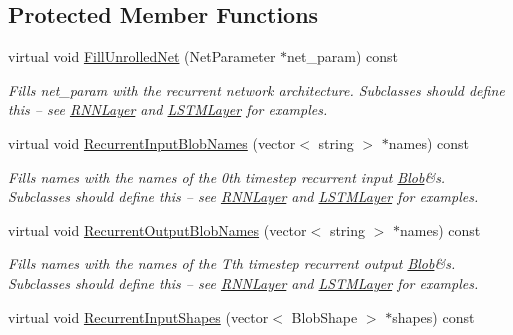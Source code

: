 \subsection*{Protected Member Functions}
\begin{DoxyCompactItemize}
\item 
virtual void \hyperlink{classcaffe_1_1LSTMLayer_aee83b6364883ffcb8f2c15a18a3031ac}{Fill\+Unrolled\+Net} (Net\+Parameter $\ast$net\+\_\+param) const \hypertarget{classcaffe_1_1LSTMLayer_aee83b6364883ffcb8f2c15a18a3031ac}{}\label{classcaffe_1_1LSTMLayer_aee83b6364883ffcb8f2c15a18a3031ac}

\begin{DoxyCompactList}\small\item\em Fills net\+\_\+param with the recurrent network architecture. Subclasses should define this -- see \hyperlink{classcaffe_1_1RNNLayer}{R\+N\+N\+Layer} and \hyperlink{classcaffe_1_1LSTMLayer}{L\+S\+T\+M\+Layer} for examples. \end{DoxyCompactList}\item 
virtual void \hyperlink{classcaffe_1_1LSTMLayer_aef811568772d8ff260be2dd99bb5e5bf}{Recurrent\+Input\+Blob\+Names} (vector$<$ string $>$ $\ast$names) const \hypertarget{classcaffe_1_1LSTMLayer_aef811568772d8ff260be2dd99bb5e5bf}{}\label{classcaffe_1_1LSTMLayer_aef811568772d8ff260be2dd99bb5e5bf}

\begin{DoxyCompactList}\small\item\em Fills names with the names of the 0th timestep recurrent input \hyperlink{classcaffe_1_1Blob}{Blob}\&s. Subclasses should define this -- see \hyperlink{classcaffe_1_1RNNLayer}{R\+N\+N\+Layer} and \hyperlink{classcaffe_1_1LSTMLayer}{L\+S\+T\+M\+Layer} for examples. \end{DoxyCompactList}\item 
virtual void \hyperlink{classcaffe_1_1LSTMLayer_a0691f390e4d79ac22ec6528a70c42394}{Recurrent\+Output\+Blob\+Names} (vector$<$ string $>$ $\ast$names) const \hypertarget{classcaffe_1_1LSTMLayer_a0691f390e4d79ac22ec6528a70c42394}{}\label{classcaffe_1_1LSTMLayer_a0691f390e4d79ac22ec6528a70c42394}

\begin{DoxyCompactList}\small\item\em Fills names with the names of the Tth timestep recurrent output \hyperlink{classcaffe_1_1Blob}{Blob}\&s. Subclasses should define this -- see \hyperlink{classcaffe_1_1RNNLayer}{R\+N\+N\+Layer} and \hyperlink{classcaffe_1_1LSTMLayer}{L\+S\+T\+M\+Layer} for examples. \end{DoxyCompactList}\item 
virtual void \hyperlink{classcaffe_1_1LSTMLayer_a7fd77e6e7cc45ba32ab62d1d24f3b381}{Recurrent\+Input\+Shapes} (vector$<$ Blob\+Shape $>$ $\ast$shapes) const \hypertarget{classcaffe_1_1LSTMLayer_a7fd77e6e7cc45ba32ab62d1d24f3b381}{}\label{classcaffe_1_1LSTMLayer_a7fd77e6e7cc45ba32ab62d1d24f3b381}


\end{DoxyCompactItemize}
